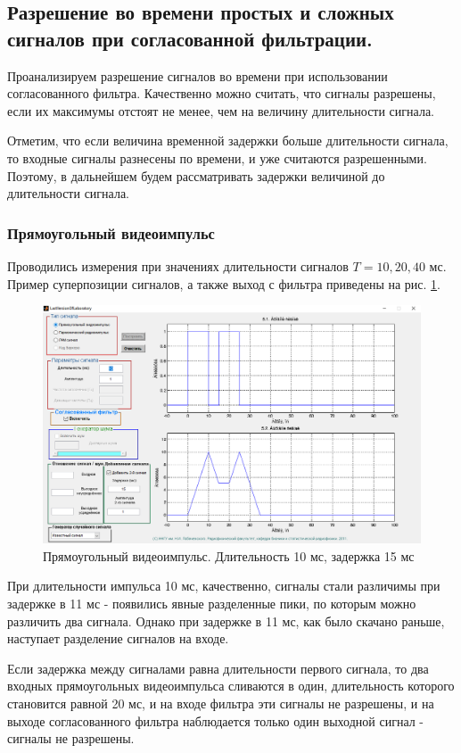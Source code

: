 \subsection{Разрешение во времени простых и сложных сигналов при
согласованной фильтрации.}

Проанализируем разрешение сигналов во времени при использовании согласованного фильтра.
Качественно можно считать, что сигналы разрешены, если их максимумы
отстоят не менее, чем на величину длительности сигнала.

Отметим, что если величина временной задержки больше длительности сигнала, то входные сигналы разнесены по времени, 
и уже считаются разрешенными. Поэтому, в дальнейшем будем рассматривать задержки величиной
до длительности сигнала.

\subsubsection{Прямоугольный видеоимпульс}
Проводились измерения при значениях длительности сигналов $T = 10, 20, 40$ мс. Пример суперпозиции сигналов, а также
выход с фильтра приведены на рис. \ref{fig:task5_1_10_15}.
\begin{figure}[H]
    \centering
    \includegraphics[width=0.7\linewidth]{imgs/task5/t5s1_dur10_del15.png}
    \caption{Прямоугольный видеоимпульс. Длительность 10 мс, задержка 15 мс}
    \label{fig:task5_1_10_15}
\end{figure}
При длительности импульса 10 мс, качественно, сигналы стали различимы при задержке в 11 мс - появились явные разделенные
пики, по которым можно различить два сигнала. Однако при задержке в 11 мс, как было скачано раньше, наступает разделение
сигналов на входе. 

Если задержка между сигналами равна длительности первого сигнала, то два входных прямоугольных видеоимпульса
сливаются в один, длительность которого становится равной 20 мс, и на входе фильтра эти сигналы не разрешены, и на
выходе согласованного фильтра наблюдается только один выходной сигнал - сигналы не разрешены.

